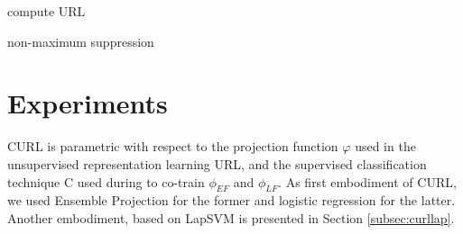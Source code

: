 \documentclass[journal,11pt]{IEEEtran}
\newcommand{\ADD}[1]{#1}
\newcommand{\emb}{embodiment}
\begin{document}
\begin{algorithm}[!tbp]
\caption{compute URL}
\label{alg:url}
\end{algorithm}


\begin{algorithm}[!tbp]
\caption{non-maximum suppression}
\label{alg:nms}
\end{algorithm}

\section{Experiments}
\label{sec:experiments}

CURL is parametric with respect to the projection function $\varphi$ used in the unsupervised representation learning \ADD{URL}, and the supervised classification technique \ADD{C} used during to co-train $\phi_{\scriptscriptstyle EF}$ and $\phi_{\scriptscriptstyle LF}$. \ADD{As first \emb{ } of CURL,} we used Ensemble Projection \cite{dai2013ensemble} for the former and logistic regression for the latter. \ADD{Another \emb, based on LapSVM \cite{belkin2006manifold} is presented in Section \ref{subsec:curllap}.}
\end{document}
